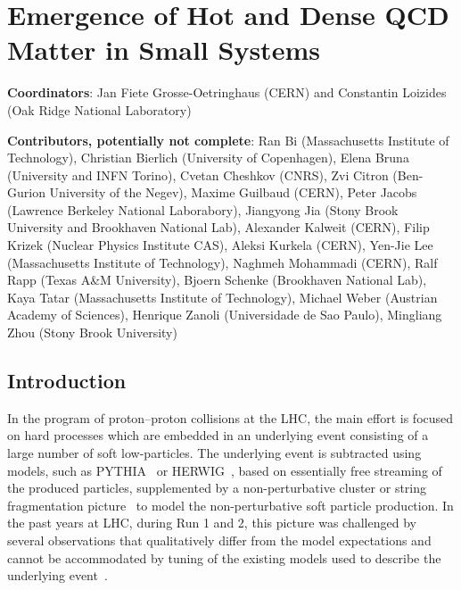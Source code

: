 \documentclass[../report.tex]{subfiles}
\begin{document}
\section{Emergence of Hot and Dense QCD Matter in Small Systems}
\label{chapter:smallsystems}

{ \small
\noindent \textbf{Coordinators}: Jan Fiete Grosse-Oetringhaus (CERN) and Constantin Loizides (Oak Ridge National Laboratory)

\noindent \textbf{Contributors, potentially not complete}:
Ran Bi (Massachusetts Institute of Technology),
Christian Bierlich (University of Copenhagen),
Elena Bruna (University and INFN Torino),
Cvetan Cheshkov (CNRS),
Zvi Citron (Ben-Gurion University of the Negev),
Maxime Guilbaud (CERN),
Peter Jacobs (Lawrence Berkeley National Laborabory),
Jiangyong Jia (Stony Brook University and Brookhaven National Lab),
Alexander Kalweit (CERN),
Filip Krizek (Nuclear Physics Institute CAS),
Aleksi Kurkela (CERN),
Yen-Jie Lee (Massachusetts Institute of Technology),
Naghmeh Mohammadi (CERN),
Ralf Rapp (Texas A\&M University),
Bjoern Schenke (Brookhaven National Lab),
Kaya Tatar (Massachusetts Institute of Technology),
Michael Weber (Austrian Academy of Sciences),
Henrique Zanoli (Universidade de Sao Paulo),
Mingliang Zhou (Stony Brook University)
}

\subsection{Introduction}

In the program of proton--proton collisions at the LHC, the main effort is focused on hard processes which are embedded in an underlying event consisting of a large number of soft low-\pT particles. The underlying event is subtracted using models, such as PYTHIA~\cite{Sjostrand:2014zea} or HERWIG~\cite{Bellm:2015jjp}, based on essentially free streaming of the produced particles, supplemented by a non-perturbative cluster or string fragmentation picture~\cite{Andersson:1983ia,Webber:1983if} to model the non-perturbative soft particle production.
In the past years at LHC, during Run 1 and 2, this picture was challenged by several observations that qualitatively differ from the model expectations and cannot be accommodated by tuning of the existing models used to describe the underlying event~\cite{Fischer:2016zzs}.
\end{document}
